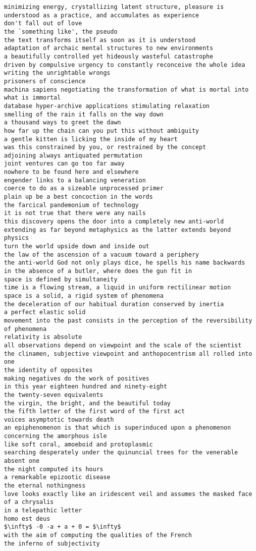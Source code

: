 \begin{verbatim}
minimizing energy, crystallizing latent structure, pleasure is understood as a practice, and accumulates as experience
don't fall out of love
the `something like', the pseudo
the text transforms itself as soon as it is understood
adaptation of archaic mental structures to new environments
a beautifully controlled yet hideously wasteful catastrophe
driven by compulsive urgency to constantly reconceive the whole idea
writing the unrightable wrongs
prisoners of conscience
machina sapiens negotiating the transformation of what is mortal into what is immortal
database hyper-archive applications stimulating relaxation
smelling of the rain it falls on the way down
a thousand ways to greet the dawn
how far up the chain can you put this without ambiguity
a gentle kitten is licking the inside of my heart
was this constrained by you, or restrained by the concept
adjoining always antiquated permutation
joint ventures can go too far away
nowhere to be found here and elsewhere
engender links to a balancing veneration
coerce to do as a sizeable unprocessed primer
plain up be a best concoction in the words
the farcical pandemonium of technology
it is not true that there were any nails
this discovery opens the door into a completely new anti-world
extending as far beyond metaphysics as the latter extends beyond physics
turn the world upside down and inside out
the law of the ascension of a vacuum toward a periphery
the anti-world God not only plays dice, he spells his name backwards
in the absence of a butler, where does the gun fit in
space is defined by simultaneity
time is a flowing stream, a liquid in uniform rectilinear motion
space is a solid, a rigid system of phenomena
the deceleration of our habitual duration conserved by inertia
a perfect elastic solid
movement into the past consists in the perception of the reversibility of phenomena
relativity is absolute
all observations depend on viewpoint and the scale of the scientist
the clinamen, subjective viewpoint and anthopocentrism all rolled into one
the identity of opposites
making negatives do the work of positives
in this year eighteen hundred and ninety-eight
the twenty-seven equivalents
the virgin, the bright, and the beautiful today
the fifth letter of the first word of the first act
voices asymptotic towards death
an epiphenomenon is that which is superinduced upon a phenomenon
concerning the amorphous isle
like soft coral, amoeboid and protoplasmic
searching desperately under the quinuncial trees for the venerable absent one
the night computed its hours
a remarkable epizootic disease
the eternal nothingness
love looks exactly like an iridescent veil and assumes the masked face of a chrysalis
in a telepathic letter
homo est deus
$\infty$ -0 -a + a + 0 = $\infty$
with the aim of computing the qualities of the French
the inferno of subjectivity
\end{verbatim}


